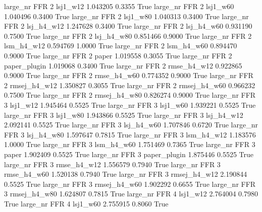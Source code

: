   large_nr      FFR                 2     lsj1_w12    1.043205      0.3355    True
  large_nr      FFR                 2     lsj1_w60    1.040496      0.3400    True
  large_nr      FFR                 2     lsj1_w80    1.040313      0.3400    True
  large_nr      FFR                 2   lsj_h4_w12    1.247628      0.3400    True
  large_nr      FFR                 2   lsj_h4_w60    0.931190      0.7500    True
  large_nr      FFR                 2   lsj_h4_w80    0.851466      0.9000    True
  large_nr      FFR                 2   lsm_h4_w12    0.594769      1.0000    True
  large_nr      FFR                 2   lsm_h4_w60    0.894470      0.9000    True
  large_nr      FFR                 2        paper    1.019558      0.3055    True
  large_nr      FFR                 2 paper_plugin    1.019068      0.3400    True
  large_nr      FFR                 2  rmse_h4_w12    0.922865      0.9000    True
  large_nr      FFR                 2  rmse_h4_w60    0.774352      0.9000    True
  large_nr      FFR                 2 rmsej_h4_w12    1.350827      0.3055    True
  large_nr      FFR                 2 rmsej_h4_w60    0.966232      0.7500    True
  large_nr      FFR                 2 rmsej_h4_w80    0.826274      0.9000    True
  large_nr      FFR                 3     lsj1_w12    1.945464      0.5525    True
  large_nr      FFR                 3     lsj1_w60    1.939221      0.5525    True
  large_nr      FFR                 3     lsj1_w80    1.943866      0.5525    True
  large_nr      FFR                 3   lsj_h4_w12    2.092141      0.5525    True
  large_nr      FFR                 3   lsj_h4_w60    1.707846      0.6720    True
  large_nr      FFR                 3   lsj_h4_w80    1.597647      0.7815    True
  large_nr      FFR                 3   lsm_h4_w12    1.183576      1.0000    True
  large_nr      FFR                 3   lsm_h4_w60    1.751469      0.7365    True
  large_nr      FFR                 3        paper    1.902409      0.5525    True
  large_nr      FFR                 3 paper_plugin    1.875446      0.5525    True
  large_nr      FFR                 3  rmse_h4_w12    1.556579      0.7940    True
  large_nr      FFR                 3  rmse_h4_w60    1.520138      0.7940    True
  large_nr      FFR                 3 rmsej_h4_w12    2.190844      0.5525    True
  large_nr      FFR                 3 rmsej_h4_w60    1.902292      0.6655    True
  large_nr      FFR                 3 rmsej_h4_w80    1.624807      0.7815    True
  large_nr      FFR                 4     lsj1_w12    2.764004      0.7980    True
  large_nr      FFR                 4     lsj1_w60    2.755915      0.8060    True
